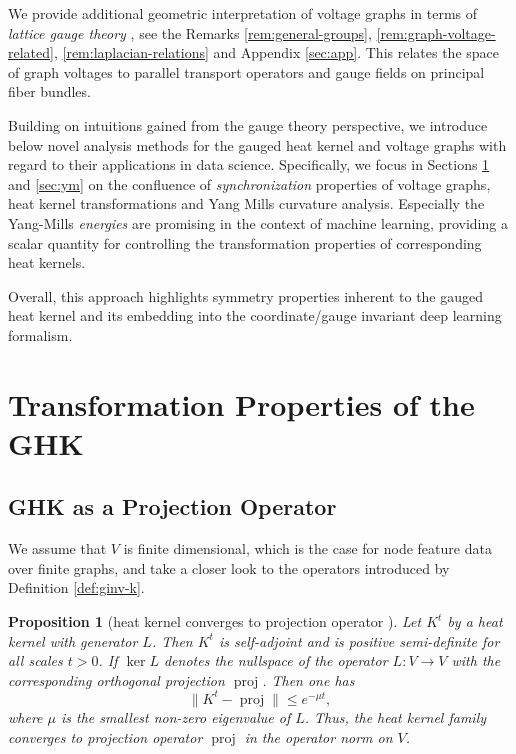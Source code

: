 \documentclass[10pt,reqno]{amsart}
\numberwithin{equation}{section}
\theoremstyle{bfnote}
\newtheorem{proposition}[theorem]{Proposition}
\theoremstyle{bfdef}
\renewcommand\o\operatorname
\providecommand\hgen; %
\renewcommand{\hgen}{L}
\begin{document}
	We provide additional geometric interpretation of voltage graphs in terms of \textit{lattice gauge theory} \cite{Gattringer:2010zz}, see the Remarks \ref{rem:general-groups}, \ref{rem:graph-voltage-related}, \ref{rem:laplacian-relations} and Appendix \ref{sec:app}. This relates the space of graph voltages to parallel transport operators and gauge fields on principal fiber bundles.

	Building on intuitions gained from the gauge theory perspective, we introduce below novel analysis methods for the gauged heat kernel and voltage graphs with regard to their applications in data science. Specifically, we focus in Sections \ref{sec:transform} and \ref{sec:ym} on the confluence of \textit{synchronization} properties of voltage graphs, heat kernel transformations and Yang Mills curvature analysis. Especially the Yang-Mills \textit{energies} are promising in the context of machine learning, providing a scalar quantity for controlling the transformation properties of corresponding heat kernels.

	Overall, this approach highlights symmetry properties inherent to the gauged heat kernel and its embedding into the coordinate/gauge invariant deep learning formalism.

\section{Transformation Properties of the GHK}\label{sec:transform}

\subsection{GHK as a Projection Operator}
		We assume that $V$ is finite dimensional, which is the case for node feature data over finite graphs, and take a closer look to the operators introduced by Definition \ref{def:ginv-k}.

	\begin{proposition}[heat kernel converges to projection operator \cite{hansenSpectralTheoryCellular2019a,hansenOpinionDynamicsDiscourse2021}]\label{prop:projection}
		Let $K^t$ by a heat kernel with generator $\hgen$. Then $K^t$ is self-adjoint and is positive semi-definite for all scales $t > 0$. If $\ker L$ denotes the nullspace of the operator $\hgen: V \to V$ with the corresponding orthogonal projection $\o{proj}$. Then one has
		\begin{equation}
			\| K^t - \o{proj} \| \leq e^{- \mu t},
		\end{equation}
		where $\mu$ is the smallest non-zero eigenvalue of $\hgen$. Thus, the heat kernel family converges to projection operator $\o{proj}$ in the operator norm on $V$.
	\end{proposition}
\end{document}
